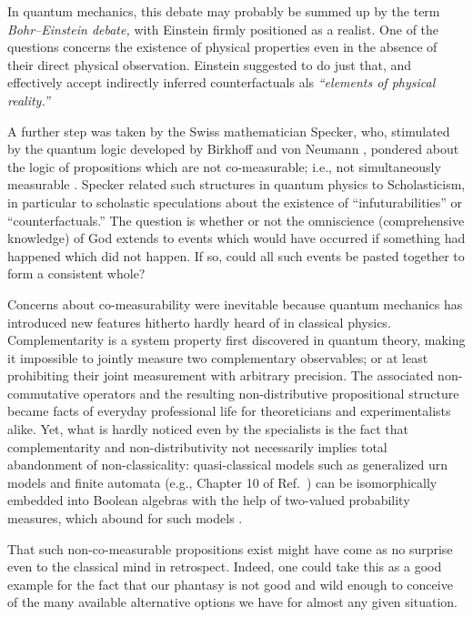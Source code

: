 \documentclass{article}
\begin{document}
In quantum mechanics, this debate may probably be summed up by the term
{\em Bohr--Einstein debate,}
with Einstein firmly positioned as a realist.
One of the questions concerns the existence of physical properties
even in the absence of their direct physical observation.
Einstein \cite{epr}
suggested to do just that, and effectively accept indirectly inferred counterfactuals
als {\em ``elements of physical reality.''}






A further step was taken by the Swiss mathematician Specker,
who, stimulated by the quantum logic developed by Birkhoff and von Neumann
\cite{birkhoff-36},
pondered about the logic of propositions which are not co-measurable; i.e., not simultaneously
measurable \cite{specker-60}.
Specker related such structures in quantum physics to
  Scholasticism,
in particular to scholastic speculations  about the existence of ``infuturabilities'' or
``counterfactuals.''
The question is whether or not
the omniscience (comprehensive knowledge) of God extends to events which
would have occurred if something  had happened which did not
happen.
If so, could all such events be pasted together to form a consistent whole?


Concerns about co-measurability were inevitable because  quantum mechanics has introduced new features
hitherto hardly heard of in classical physics.
Complementarity is a system property first discovered in quantum theory,
making it impossible to jointly measure two complementary observables; or at least prohibiting
their joint measurement with arbitrary precision.
The associated non-commutative operators and the resulting non-distributive propositional structure
became facts of everyday professional life for theoreticians and experimentalists alike.
Yet, what is hardly noticed even by the specialists is the fact
that complementarity and non-distributivity
not necessarily implies total abandonment of non-classicality:
quasi-classical models such as generalized urn models
\cite{wright:pent,wright} and finite automata (e.g., Chapter 10 of Ref.~\cite{svozil-ql})
can be isomorphically embedded into Boolean algebras
with the help of two-valued probability measures,
which abound for such models  \cite{svozil-2001-eua}.

That such non-co-measurable propositions exist might have come as no surprise
even to the classical mind in retrospect.
Indeed, one could take this as a good example for the fact that our phantasy is not good and wild enough to conceive of
the many available alternative options we have for almost any given situation.
\end{document}
